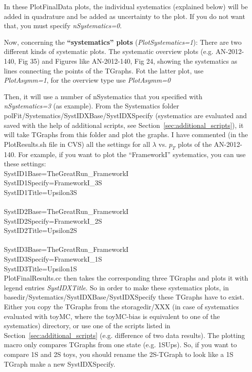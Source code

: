 \documentclass{article}
\begin{document}
In these PlotFinalData plots, the individual systematics (explained below) will be added in quadrature and be added as uncertainty to the plot. If you do not want that, you must specify \emph{nSystematics=0}.

Now, concerning the {\bf ``systematics'' plots} (\emph{PlotSystematics=1}): There are two different kinds of systematic plots. The systematic overview plots (e.g. AN-2012-140, Fig 35) and Figures like AN-2012-140, Fig 24, showing the systematics as lines connecting the points of the TGraphs.
Fot the latter plot, use \emph{PlotAsymm=1}, for the overview type use \emph{PlotAsymm=0}

Then, it will use a number of nSystematics that you specified with \emph{nSystematics=3} (as example).
From the Systematics folder polFit/Systematics/SystIDXBase/SystIDXSpecify (systematics are evaluated and saved with the help of additional scripts, see Section~\ref{sec:additional_scripts}), it will take TGraphs from this folder and plot the graphs. I have commented (in the PlotResults.sh file in CVS) all the settings for all $\lambda$ vs. $p_T$ plots of the AN-2012-140. For example, if you want to plot the ``FrameworkI'' systematics, you can use these settings:
\\
SystID1Base=TheGreatRun\_FrameworkI\\
SystID1Specify=FrameworkI\_3S\\
SystID1Title=Upsilon3S\\
\\
SystID2Base=TheGreatRun\_FrameworkI\\
SystID2Specify=FrameworkI\_2S\\
SystID2Title=Upsilon2S\\
\\
SystID3Base=TheGreatRun\_FrameworkI\\
SystID3Specify=FrameworkI\_1S\\
SystID3Title=Upsilon1S\\

PlotFinalResults.cc then takes the corresponding three TGraphs and plots it with legend entries \emph{SystIDXTitle}. So in order to make these systematics plots, in basedir/Systematics/SystIDXBase/SystIDXSpecify these TGraphs have to exist. Either you copy the TGraphs from the storagedir/XXX (in case of systematics evaluated with toyMC, where the toyMC-bias is equivalent to one of the systematics) directory, or use one of the scripts listed in Section~\ref{sec:additional_scripts} (e.g. difference of two data results). The plotting macro only compares TGraphs from one state (e.g. 1SUps). So, if you want to compare 1S and 2S toys, you should rename the 2S-TGraph to look like a 1S TGraph make a new SystIDXSpecify.
\end{document}
